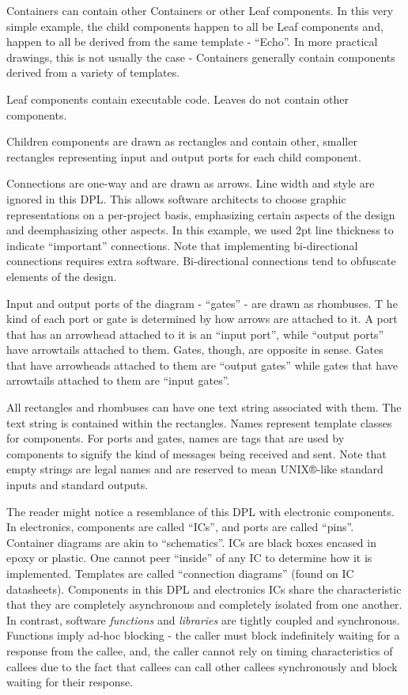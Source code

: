 \documentclass[10pt,anonymous,review]{acmart}
\begin{document}
Containers can contain other Containers or other Leaf components. In this very simple example, the child components happen to all be Leaf components and, happen to all be derived from the same template - “Echo”. In more practical drawings, this is not usually the case - Containers generally contain components derived from a variety of templates.

Leaf components contain executable code. Leaves do not contain other components.

Children components are drawn as rectangles and contain other, smaller rectangles representing input and output ports for each child component.

Connections are one-way and are drawn as arrows. Line width and style are ignored in this DPL. This allows software architects to choose graphic representations on a per-project basis, emphasizing certain aspects of the design and deemphasizing other aspects. In this example, we used 2pt line thickness to indicate “important” connections. Note that implementing bi-directional connections requires extra software. Bi-directional connections tend to obfuscate elements of the design.

Input and output ports of the diagram - “gates” - are drawn as rhombuses. 
T
he kind of each port or gate is determined by how arrows are attached to it. A port that has an arrowhead attached to it is an “input port”, while “output ports” have arrowtails attached to them. Gates, though, are opposite in sense. Gates that have arrowheads attached to them are “output gates” while gates that have arrowtails attached to them are “input gates”.

All rectangles and rhombuses can have one text string associated with them. The text string is contained within the rectangles. Names represent template classes for components. For ports and gates, names are tags that are used by components to signify the kind of messages being received and sent. Note that empty strings are legal names and are reserved to mean UNIX®-like standard inputs and standard outputs.

The reader might notice a resemblance of this DPL with electronic components. In electronics, components are called “ICs”, and ports are called “pins”. Container diagrams are akin to “schematics”. ICs are black boxes encased in epoxy or plastic. One cannot peer “inside” of any IC to determine how it is implemented. Templates are called “connection diagrams” (found on IC datasheets). Components in this DPL and electronics ICs share the characteristic that they are completely asynchronous and completely isolated from one another. In contrast, software \emph{functions} and \emph{libraries} are tightly coupled and synchronous. Functions imply ad-hoc blocking - the caller must block indefinitely waiting for a response from the callee, and, the caller cannot rely on timing characteristics of callees due to the fact that callees can call other callees synchronously and block waiting for their response. 
\end{document}
